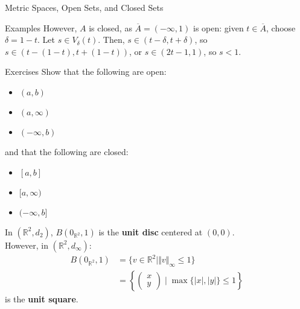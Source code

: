\documentclass[8pt]{extarticle}
\newcommand{\R}{\mathbb{R}}
\begin{document}
\begin{problem}{Metric Spaces, Open Sets, and Closed Sets}
\begin{problem}{Examples}
      However, $A$ is closed, as $\overline{A} = (-\infty,1)$ is open: given $t\in \overline{A}$, choose $\delta = 1-t$. Let $s\in V_{\delta}(t)$. Then, $s\in (t-\delta, t+\delta)$, so $s\in (t-(1-t),t + (1-t))$, or $s\in(2t-1,1)$, so $s < 1$.
    \end{problem}
    \begin{problem}{Exercises}
      Show that the following are open:
      \begin{itemize}
        \item $(a,b)$
        \item $(a,\infty)$
        \item $(-\infty,b)$
      \end{itemize}
      and that the following are closed:
      \begin{itemize}
        \item $[a,b]$
        \item $[a,\infty)$
        \item $(-\infty,b]$
      \end{itemize}
    \end{problem}
    In $(\R^2,d_2)$, $B(0_{\R^2},1)$ is the \textbf{unit disc} centered at $(0,0)$.\\

    However, in $(\R^2,d_{\infty})$:
    \begin{align*}
      B(0_{\R^2},1) &= \{v\in\R^2 \mid \Vert v \Vert_{\infty} \leq 1\}\\
                    &= \left\{\begin{pmatrix}x\\y\end{pmatrix}\mid \max\{|x|,|y|\}\leq 1\right\}
    \end{align*}
    is the \textbf{unit square}.
  \end{problem}
\end{document}
